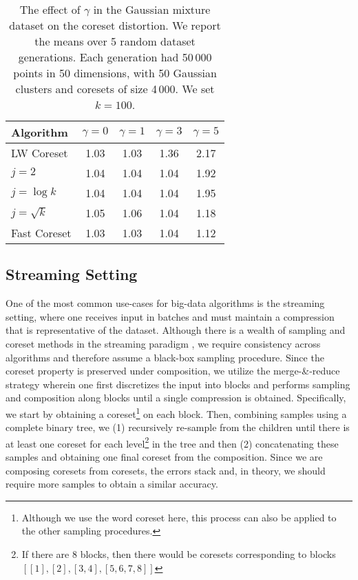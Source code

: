 \begin{table}[htbp]
    \centering
    \begin{tabular}{lcccc}
        Algorithm & $\gamma = 0$ & $\gamma = 1$ & $\gamma = 3$ & $\gamma = 5$\\
        \hline
        LW Coreset & 1.03 & 1.03 & 1.36 & 2.17\\
        $j=2$ & 1.04 & 1.04 & 1.04 & 1.92\\
        $j=\log k$ & 1.04 & 1.04 & 1.04 & 1.95\\
        $j=\sqrt{k}$ & 1.05 & 1.06 & 1.04 & 1.18\\
        Fast Coreset & 1.03 & 1.03 & 1.04 & 1.12
    \end{tabular}
    \caption{The effect of $\gamma$ in the Gaussian mixture dataset on the coreset distortion. We report the means over 5 random dataset generations.
    Each generation had 50\,000 points in 50 dimensions, with 50 Gaussian clusters and coresets of size 4\,000. We set $k=100$.}
    \label{tbl:class-imbalance}
\end{table}

\subsection{Streaming Setting}
\label{ssec:streaming}

One of the most common use-cases for big-data algorithms is the streaming setting, where one receives input in batches and must maintain a compression that is
representative of the dataset. Although there is a wealth of sampling and coreset methods in the streaming paradigm , we require consistency
across algorithms and therefore assume a black-box sampling procedure. Since the coreset property is preserved under composition, we utilize the merge-\&-reduce
strategy  wherein one first discretizes the input into blocks and performs sampling and composition along blocks until a single compression
is obtained. Specifically, we start by obtaining a coreset\footnote{Although we use the word coreset here, this process can also be applied to the other
sampling procedures.} on each block. Then, combining samples using a complete binary tree, we (1) recursively re-sample from the children until there is at
least one coreset for each level\footnote{If there are 8 blocks, then there would be coresets corresponding to blocks $[[1], [2], [3, 4], [5, 6, 7, 8]]$} in the
tree and then (2) concatenating these samples and obtaining one final coreset from the composition. Since we are composing coresets from coresets, the errors
stack and, in theory, we should require more samples to obtain a similar accuracy. 

